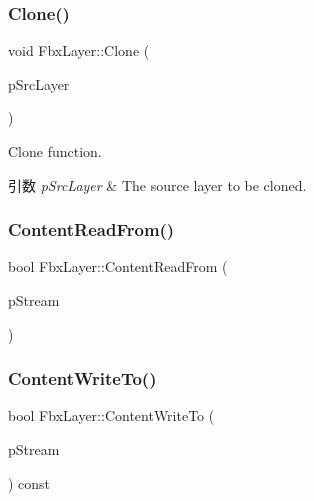 \subsubsection{\texorpdfstring{Clone()}{Clone()}}
{\footnotesize\ttfamily void Fbx\+Layer\+::\+Clone (\begin{DoxyParamCaption}\item[{\hyperlink{class_fbx_layer}{Fbx\+Layer} const \&}]{p\+Src\+Layer }\end{DoxyParamCaption})}

Clone function. 
\begin{DoxyParams}{引数}
{\em p\+Src\+Layer} & The source layer to be cloned. \\
\hline
\end{DoxyParams}
\mbox{\label{class_fbx_layer_a1792e8893a30458e6634f3db09a592d5}} 
\subsubsection{\texorpdfstring{Content\+Read\+From()}{ContentReadFrom()}}
{\footnotesize\ttfamily bool Fbx\+Layer\+::\+Content\+Read\+From (\begin{DoxyParamCaption}\item[{const \hyperlink{class_fbx_stream}{Fbx\+Stream} \&}]{p\+Stream }\end{DoxyParamCaption})}

\mbox{\label{class_fbx_layer_a770af000fd689d4bcb50cf92a93d05eb}} 
\subsubsection{\texorpdfstring{Content\+Write\+To()}{ContentWriteTo()}}
{\footnotesize\ttfamily bool Fbx\+Layer\+::\+Content\+Write\+To (\begin{DoxyParamCaption}\item[{\hyperlink{class_fbx_stream}{Fbx\+Stream} \&}]{p\+Stream }\end{DoxyParamCaption}) const}

\mbox{\label{class_fbx_layer_aaad9ca915179b63c47a51f6b77cbaf43}} 
